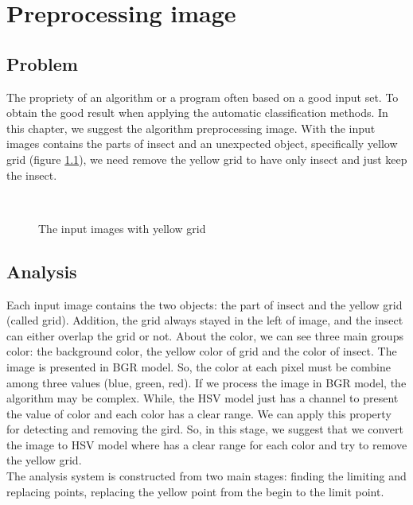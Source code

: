 \chapter{Preprocessing image}
\section{Problem}
The propriety of an algorithm or a program often based on a good input set. To obtain the good result when applying the automatic classification methods. In this chapter, we suggest the algorithm preprocessing image. With the input images contains the parts of insect and an unexpected object, specifically yellow grid (figure \ref{fig:figure_31}), we need remove the yellow grid to have only insect and just keep the insect.
\begin{figure}[h!]
\centering
{}~~
\caption{The input images with yellow grid}
\label{fig:figure_31}
\end{figure}
\section{Analysis}
Each input image contains the two objects: the part of insect and the yellow grid (called grid). Addition, the grid always stayed in the left of image, and the insect can either overlap the grid or not. About the color, we can see three main groups color: the background color, the yellow color of grid and the color of insect. The image is presented in BGR model. So, the color at each pixel must be combine among three values (blue, green, red). If we process the image in BGR model, the algorithm may be complex. While, the HSV model just has a channel to present the value of color and each color has a clear range. We can apply this property for detecting and removing the gird. So, in this stage, we suggest that we convert the image to HSV model where has a clear range for each color and try to remove the yellow grid.\\
The analysis system is constructed from two main stages: finding the limiting and replacing points, replacing the yellow point from the begin to the limit point.
